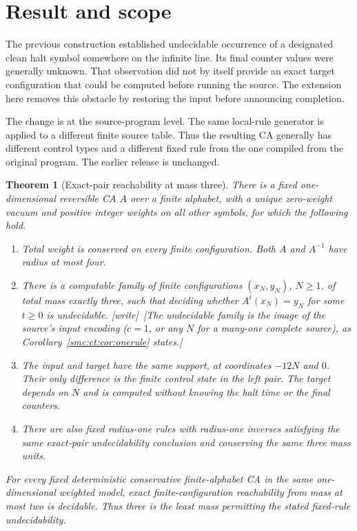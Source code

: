 \documentclass[11pt,letterpaper]{article}
\numberwithin{equation}{section}
\newtheorem{theorem}{Theorem}[section]
\theoremstyle{definition}
\theoremstyle{remark}
\newcommand{\wtag}{\textup{[write]}}
\begin{document}
\section{Result and scope}\label{smc:ct:sec:result}

The previous construction established undecidable occurrence of a designated clean halt symbol somewhere on the infinite line. Its final counter values were generally unknown. That observation did not by itself provide an exact target configuration that could be computed before running the source. The extension here removes this obstacle by restoring the input before announcing completion.

The change is at the source-program level. The same local-rule generator is applied to a different finite source table. Thus the resulting CA generally has different control types and a different fixed rule from the one compiled from the original program. The earlier release is unchanged.

\begin{theorem}[Exact-pair reachability at mass three]\label{smc:ct:thm:main}
There is a fixed one-dimensional reversible CA $A$ over a finite alphabet, with a unique zero-weight vacuum and positive integer weights on all other symbols, for which the following hold.
\begin{enumerate}
\item Total weight is conserved on every finite configuration. Both $A$ and $A^{-1}$ have radius at most four.
\item There is a computable family of finite configurations $(x_N,y_N)$, $N\ge1$, of total mass exactly three, such that deciding whether $A^t(x_N)=y_N$ for some $t\ge0$ is undecidable. \wtag\ [The undecidable family is the image of the source's input encoding ($c=1$, or any $N$ for a many-one complete source), as Corollary~\ref{smc:ct:cor:onerule} states.]
\item The input and target have the same support, at coordinates $-12N$ and $0$. Their only difference is the finite control state in the left pair. The target depends on $N$ and is computed without knowing the halt time or the final counters.
\item There are also fixed radius-one rules with radius-one inverses satisfying the same exact-pair undecidability conclusion and conserving the same three mass units.
\end{enumerate}
For every fixed deterministic conservative finite-alphabet CA in the same one-dimensional weighted model, exact finite-configuration reachability from mass at most two is decidable. Thus three is the least mass permitting the stated fixed-rule undecidability.
\end{theorem}
\end{document}
